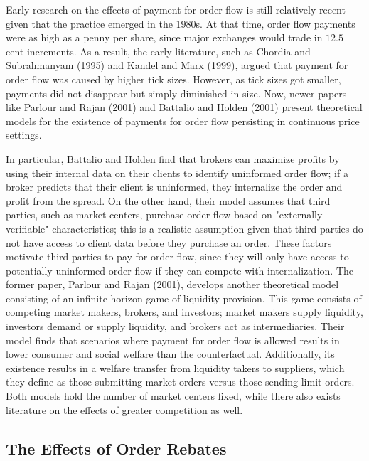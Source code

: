 \documentclass[12pt,a4paper]{article}
\begin{document}
		Early research on the effects of payment for order flow is still relatively recent given that the practice emerged in the 1980s. At that time, order flow payments were as high as a penny per share, since major exchanges would trade in $12.5$ cent increments. As a result, the early literature, such as Chordia and Subrahmanyam (1995) and Kandel and Marx (1999), argued that payment for order flow was caused by higher tick sizes. However, as tick sizes got smaller, payments did not disappear but simply diminished in size. Now, newer papers like Parlour and Rajan (2001) and Battalio and Holden (2001) present theoretical models for the existence of payments for order flow persisting in continuous price settings. 
		
		In particular, Battalio and Holden find that brokers can maximize profits by using their internal data on their clients to identify uninformed order flow; if a broker predicts that their client is uninformed, they internalize the order and profit from the spread. On the other hand, their model assumes that third parties, such as market centers, purchase order flow based on "externally-verifiable" characteristics; this is a realistic assumption given that third parties do not have access to client data before they purchase an order. These factors motivate third parties to pay for order flow, since they will only have access to potentially uninformed order flow if they can compete with internalization. The former paper, Parlour and Rajan (2001), develops another theoretical model consisting of an infinite horizon game of liquidity-provision. This game consists of competing market makers, brokers, and investors; market makers supply liquidity, investors demand or supply liquidity, and brokers act as intermediaries. Their model finds that scenarios where payment for order flow is allowed results in lower consumer and social welfare than the counterfactual. Additionally, its existence results in a welfare transfer from liquidity takers to suppliers, which they define as those submitting market orders versus those sending limit orders. Both models hold the number of market centers fixed, while there also exists literature on the effects of greater competition as well. 
	
	\subsection{The Effects of Order Rebates}
	
\end{document}
